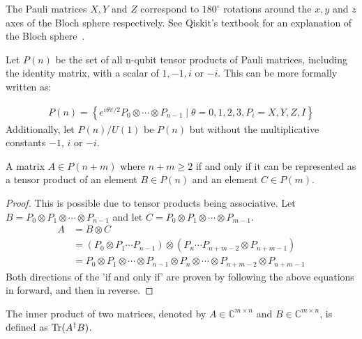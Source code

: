 The Pauli matrices $X,Y$ and $Z$ correspond to $180^{\circ}$ rotations around the $x,y$ and $z$ axes of the Bloch sphere respectively. See Qiskit's textbook for an explanation of the Bloch sphere~\cite{Qiskit-Textbook}.

Let $P(n)$ be the set of all n-qubit tensor products of Pauli matrices, including the identity matrix, with a scalar of $1, -1, i$ or $-i$. This can be more formally written as:

\begin{align}
\label{eq:pauliDefinition}
P(n)=\left\{ e^{i\theta\pi/2} P_0 \otimes \cdots \otimes P_{n-1} \mid \theta = 0,1,2,3, P_i = X,Y,Z,I\right\}
\end{align}
Additionally, let $P(n) / U(1)$ be $P(n)$ but without the multiplicative constants $-1$, $i$ or $-i$.

\begin{theorem}
\label{theoremPauli}
A matrix $A \in P(n + m)$ where $n + m \geq 2$ if and only if it can be represented as a tensor product of an element $B \in P(n)$ and an element $C \in P(m)$.
\end{theorem}
\begin{proof}
This is possible due to tensor products being associative. Let $B = P_0 \otimes P_1 \otimes \cdots \otimes P_{n-1}$ and let $C =  P_0 \otimes P_1 \otimes \cdots \otimes P_{m-1}$.
\begin{align}
A &=B \otimes C \\
&= (P_0 \otimes P_1 \cdots P_{n-1}) \otimes (P_{n} \cdots P_{n+m-2} \otimes P_{n+m-1}) \\
&= P_0 \otimes P_1 \otimes \cdots \otimes P_{n-1} \otimes P_n \otimes \cdots \otimes P_{n+m-2} \otimes P_{n+m-1}
\end{align}
Both directions of the 'if and only if' are proven by following the above equations in forward, and then in reverse.
\end{proof}

The inner product of two matrices, denoted by $A \in \mathbb{C}^{m \times n}$ and $B \in \mathbb{C}^{m \times n}$, is defined as $\operatorname{Tr} (A^{\dagger} B)$.

